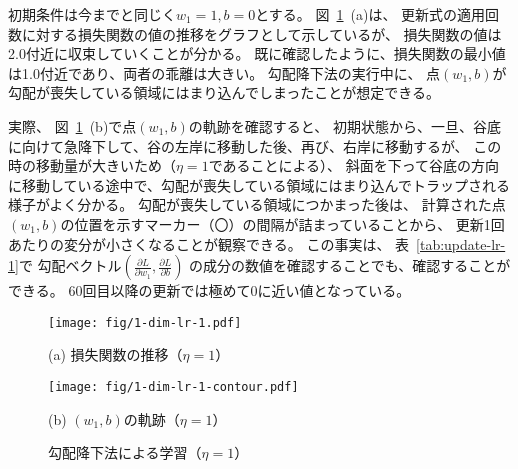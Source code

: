 初期条件は今までと同じく$w_1 = 1, b = 0$とする。
図~\ref{fig:grad-descent-1}~(a)は、
更新式の適用回数に対する損失関数の値の推移をグラフとして示しているが、
損失関数の値は2.0付近に収束していくことが分かる。
既に確認したように、損失関数の最小値は1.0付近であり、両者の乖離は大きい。
勾配降下法の実行中に、
点$(w_1, b)$が勾配が喪失している領域にはまり込んでしまったことが想定できる。

実際、
図~\ref{fig:grad-descent-1}~(b)で点$(w_1, b)$の軌跡を確認すると、
初期状態から、一旦、谷底に向けて急降下して、谷の左岸に移動した後、再び、右岸に移動するが、
この時の移動量が大きいため（$\eta = 1$であることによる）、
斜面を下って谷底の方向に移動している途中で、勾配が喪失している領域にはまり込んでトラップされる様子がよく分かる。
勾配が喪失している領域につかまった後は、
計算された点$(w_1, b)$の位置を示すマーカー（〇）の間隔が詰まっていることから、
更新1回あたりの変分が小さくなることが観察できる。
この事実は、
表~\ref{tab:update-lr-1}で
勾配ベクトル$\left(\frac{\partial L}{\partial w_1}, \frac{\partial L}{\partial b}\right)$
の成分の数値を確認することでも、確認することができる。
60回目以降の更新では極めて0に近い値となっている。

\begin{figure}

  \texttt{[image: fig/1-dim-lr-1.pdf]}

  (a) 損失関数の推移（$\eta = 1$）
  
  \texttt{[image: fig/1-dim-lr-1-contour.pdf]}

  (b) $(w_1, b)$の軌跡（$\eta = 1$）
  
  \caption{勾配降下法による学習（$\eta = 1$）}
  \label{fig:grad-descent-1}
\end{figure}

